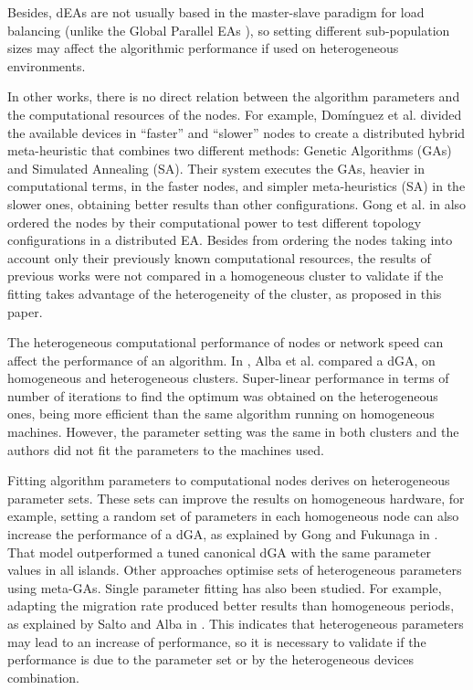 \documentclass[final,1p,times]{elsarticle}
\begin{document}
 Besides, dEAs are not usually based in the master-slave paradigm for
load balancing (unlike the Global Parallel EAs
\cite{alba2002parallelism}), so setting different sub-population sizes
may affect the algorithmic performance if used on heterogeneous
environments. 

In other works, there is no direct relation between the algorithm parameters and the
computational resources of the nodes. For example, Dom\'inguez et al. \cite{HYDROCM} 
divided the available devices in ``faster'' and ``slower'' nodes to create a distributed hybrid 
meta-heuristic that combines two different methods: Genetic Algorithms (GAs) and Simulated
Annealing (SA). Their system executes the GAs, heavier in computational
terms, in the faster nodes, and
simpler meta-heuristics (SA) in the slower ones, obtaining better results
than other configurations.  Gong et al. in \cite{HETEROGENEOUSTOPOLOGY} also ordered 
the nodes by their computational power to test different topology configurations in a distributed EA.
Besides from ordering the nodes taking into account 
only their previously known computational resources, the results of previous works were not compared in a homogeneous 
cluster to validate if the fitting takes advantage of the heterogeneity 
of the cluster, as proposed in this paper.

The heterogeneous computational performance of nodes or network speed can affect the performance of an algorithm. In \cite{HETEROGENEOUSHARD},
 Alba et al. compared a dGA, 
 on homogeneous and heterogeneous clusters. 
 Super-linear performance in terms of number of iterations to find the optimum was obtained on the heterogeneous ones,
 being more efficient than the same algorithm running on homogeneous
 machines. However, the parameter setting was the same in both
 clusters and the authors did not fit the parameters to the machines used. 



Fitting algorithm parameters to computational nodes derives on heterogeneous parameter sets. These sets can improve the results on homogeneous hardware, for example, setting a random set of parameters in each homogeneous node can also increase the
performance of a dGA, as explained by Gong
and Fukunaga in \cite{HETEROGENEOUSPARAMETERS}. That model
outperformed a tuned canonical dGA with the same parameter values in
all islands. Other approaches \cite{PanaceasClune05,ParallelGATongchim02} optimise sets of heterogeneous parameters using meta-GAs. Single parameter fitting has also been  studied. For example, adapting the migration rate produced better
results than homogeneous periods, as explained by Salto and Alba in
\cite{HETEROGENEOUSMIGRATION}. This indicates that heterogeneous parameters
 may lead to an increase of performance, so it is necessary to validate if the 
 performance is due to the parameter set or by the heterogeneous devices combination.
\end{document}
